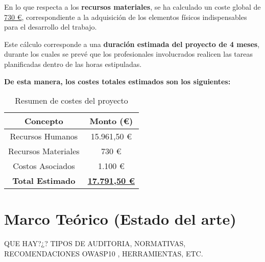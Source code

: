 \documentclass[a4paper, 10pt]{article}
\begin{document}
En lo que respecta a los \textbf{recursos materiales}, se ha calculado un coste global de \underline{730 €}, correspondiente a la adquisición de los elementos físicos indispensables para el desarrollo del trabajo.  
\par\vspace{0.3cm}

Este cálculo corresponde a una \textbf{duración estimada del proyecto de 4 meses}, durante los cuales se prevé que los profesionales involucrados realicen las tareas planificadas dentro de las horas estipuladas.  

\par\vspace{0.5cm}
\textbf{De esta manera, los costes totales estimados son los siguientes:}  

\begin{table}[H]
\centering
\renewcommand{\arraystretch}{1.5}
\begin{tabular}{|c|c|}
\hline
\textbf{Concepto} & \textbf{Monto (€)} \\ \hline
Recursos Humanos & 15.961,50 € \\ \hline
Recursos Materiales & 730 € \\ \hline
Costos Asociados & 1.100 € \\ \hline
\textbf{Total Estimado} & \underline{\textbf{17.791,50 €}} \\ \hline
\end{tabular}
\caption{Resumen de costes del proyecto}
\label{tab:resumen_costes}
\end{table}



\clearpage































\section{Marco Teórico (Estado del arte)}
QUE HAY?¿? TIPOS DE AUDITORIA, NORMATIVAS, RECOMENDACIONES OWASP10 , HERRAMIENTAS, ETC.
\end{document}
